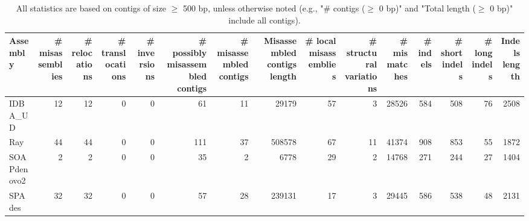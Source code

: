 \documentclass[12pt,a4paper]{article}
\begin{document}
\begin{table}[ht]
\begin{center}
\caption{All statistics are based on contigs of size $\geq$ 500 bp, unless otherwise noted (e.g., "\# contigs ($\geq$ 0 bp)" and "Total length ($\geq$ 0 bp)" include all contigs).}
\begin{tabular}{|l*{14}{|r}|}
\hline
Assembly & \# misassemblies &     \# relocations &     \# translocations &     \# inversions & \# possibly misassembled contigs & \# misassembled contigs & Misassembled contigs length & \# local misassemblies & \# structural variations & \# mismatches & \# indels &     \# short indels &     \# long indels & Indels length \\ \hline
IDBA\_UD & 12 & 12 & 0 & 0 & 61 & 11 & 29179 & 57 & 3 & 28526 & 584 & 508 & 76 & 2508 \\ \hline
Ray & 44 & 44 & 0 & 0 & 111 & 37 & 508578 & 67 & 11 & 41374 & 908 & 853 & 55 & 1872 \\ \hline
SOAPdenovo2 & 2 & 2 & 0 & 0 & 35 & 2 & 6778 & 29 & 2 & 14768 & 271 & 244 & 27 & 1404 \\ \hline
SPAdes & 32 & 32 & 0 & 0 & 57 & 28 & 239131 & 17 & 3 & 29445 & 586 & 538 & 48 & 2131 \\ \hline
\end{tabular}
\end{center}
\end{table}
\end{document}
